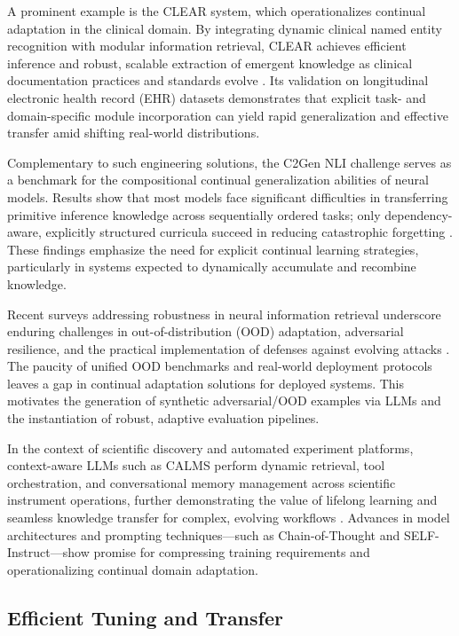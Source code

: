 A prominent example is the CLEAR system, which operationalizes continual adaptation in the clinical domain. By integrating dynamic clinical named entity recognition with modular information retrieval, CLEAR achieves efficient inference and robust, scalable extraction of emergent knowledge as clinical documentation practices and standards evolve \cite{ref7}. Its validation on longitudinal electronic health record (EHR) datasets demonstrates that explicit task- and domain-specific module incorporation can yield rapid generalization and effective transfer amid shifting real-world distributions.

Complementary to such engineering solutions, the C2Gen NLI challenge serves as a benchmark for the compositional continual generalization abilities of neural models. Results show that most models face significant difficulties in transferring primitive inference knowledge across sequentially ordered tasks; only dependency-aware, explicitly structured curricula succeed in reducing catastrophic forgetting \cite{ref46}. These findings emphasize the need for explicit continual learning strategies, particularly in systems expected to dynamically accumulate and recombine knowledge.

Recent surveys addressing robustness in neural information retrieval underscore enduring challenges in out-of-distribution (OOD) adaptation, adversarial resilience, and the practical implementation of defenses against evolving attacks \cite{ref54}. The paucity of unified OOD benchmarks and real-world deployment protocols leaves a gap in continual adaptation solutions for deployed systems. This motivates the generation of synthetic adversarial/OOD examples via LLMs and the instantiation of robust, adaptive evaluation pipelines.

In the context of scientific discovery and automated experiment platforms, context-aware LLMs such as CALMS perform dynamic retrieval, tool orchestration, and conversational memory management across scientific instrument operations, further demonstrating the value of lifelong learning and seamless knowledge transfer for complex, evolving workflows \cite{ref61}. Advances in model architectures and prompting techniques—such as Chain-of-Thought and SELF-Instruct—show promise for compressing training requirements and operationalizing continual domain adaptation.

\subsection{Efficient Tuning and Transfer}

